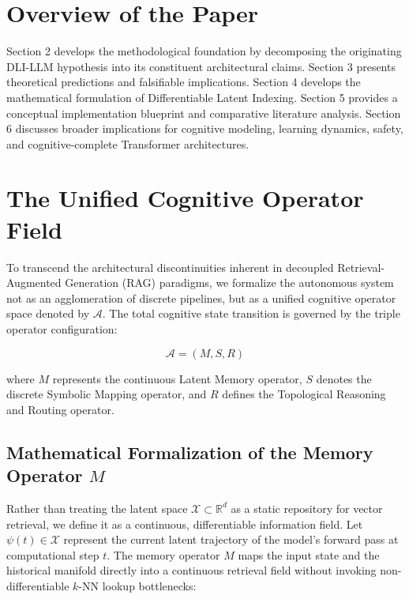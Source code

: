 \section{Overview of the Paper}
Section 2 develops the methodological foundation by decomposing the originating DLI-LLM hypothesis into its constituent architectural claims. Section 3 presents theoretical predictions and falsifiable implications. Section 4 develops the mathematical formulation of Differentiable Latent Indexing. Section 5 provides a conceptual implementation blueprint and comparative literature analysis. Section 6 discusses broader implications for cognitive modeling, learning dynamics, safety, and cognitive-complete Transformer architectures.

\section{The Unified Cognitive Operator Field}

To transcend the architectural discontinuities inherent in decoupled Retrieval-Augmented Generation (RAG) paradigms, we formalize the autonomous system not as an agglomeration of discrete pipelines, but as a unified cognitive operator space denoted by $\mathcal{A}$. The total cognitive state transition is governed by the triple operator configuration:

\begin{equation}
\mathcal{A} = (M, S, R)
\end{equation}

where $M$ represents the continuous Latent Memory operator, $S$ denotes the discrete Symbolic Mapping operator, and $R$ defines the Topological Reasoning and Routing operator. 

\subsection{\texorpdfstring{Mathematical Formalization of the Memory Operator $M$}{Mathematical Formalization of the Memory Operator M}}

Rather than treating the latent space $\mathcal{X} \subset \mathbb{R}^d$ as a static repository for vector retrieval, we define it as a continuous, differentiable information field. Let $\psi(t) \in \mathcal{X}$ represent the current latent trajectory of the model's forward pass at computational step $t$. The memory operator $M$ maps the input state and the historical manifold directly into a continuous retrieval field without invoking non-differentiable $k$-NN lookup bottlenecks:

